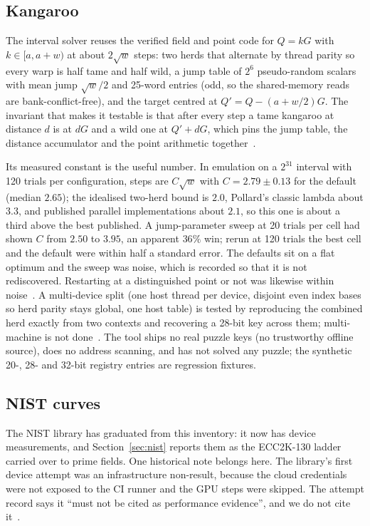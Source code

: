 \subsection{Kangaroo}
\label{sec:othergpu-kangaroo}

The interval solver reuses the verified field and point code for
$Q=kG$ with $k\in[a,a+w)$ at about $2\sqrt w$ steps: two herds that
alternate by thread parity so every warp is half tame and half wild,
a jump table of $2^6$ pseudo-random scalars with mean jump $\sqrt w/2$
and 25-word entries (odd, so the shared-memory reads are
bank-conflict-free), and the target centred at $Q'=Q-(a+w/2)G$. The
invariant that makes it testable is that after every step a tame
kangaroo at distance $d$ is at $dG$ and a wild one at $Q'+dG$, which
pins the jump table, the distance accumulator and the point
arithmetic together~.

Its measured constant is the useful number. In emulation on a $2^{31}$
interval with 120 trials per configuration, steps are $C\sqrt w$ with
$C=2.79\pm0.13$ for the default (median $2.65$); the idealised
two-herd bound is $2.0$, Pollard's classic lambda about $3.3$, and
published parallel implementations about $2.1$, so this one is about a
third above the best published. A jump-parameter sweep at 20 trials
per cell had shown $C$ from $2.50$ to $3.95$, an apparent $36\%$ win;
rerun at 120 trials the best cell and the default were within half a
standard error. The defaults sit on a flat optimum and the sweep was
noise, which is recorded so that it is not rediscovered. Restarting
at a distinguished point or not was likewise within
noise~. A multi-device
split (one host thread per device, disjoint even index bases so herd
parity stays global, one host table) is tested by reproducing the
combined herd exactly from two contexts and recovering a 28-bit key
across them; multi-machine is not done~.
The tool ships no real puzzle keys (no trustworthy offline source),
does no address scanning, and has not solved any puzzle; the
synthetic 20-, 28- and 32-bit registry entries are regression fixtures.

\subsection{NIST curves}
\label{sec:othergpu-nist}

The NIST library has graduated from this inventory: it now has device
measurements, and Section~\ref{sec:nist} reports them as the ECC2K-130
ladder carried over to prime fields. One historical note belongs
here. The library's first device attempt was an infrastructure
non-result, because the cloud credentials were not exposed to the CI
runner and the GPU steps were skipped. The attempt record says it
``must not be cited as performance evidence'', and we do not cite
it~.

